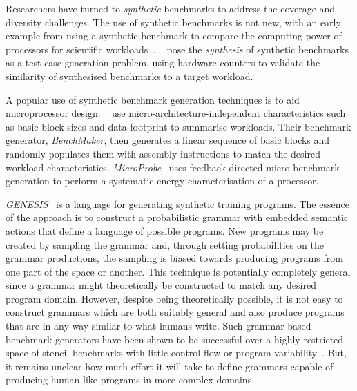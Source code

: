 Researchers have turned to \emph{synthetic} benchmarks to address the coverage and diversity challenges.
The use of synthetic benchmarks is not new, with an early example from \citeyear{Curnow1976} using a synthetic benchmark to compare the computing power of processors for scientific workloads~\cite{Curnow1976}.
\citeauthor{Bell2005}~\cite{Bell2005} pose the \emph{synthesis} of synthetic benchmarks as a test case generation problem, using hardware counters to validate the similarity of synthesised benchmarks to a target workload.

A popular use of synthetic benchmark generation techniques is to aid microprocessor design. \citeauthor{Joshi2008}~\cite{Joshi2008} use micro-architecture-independent characteristics such as basic block sizes and data footprint to summarise workloads. Their benchmark generator, \emph{BenchMaker}, then generates a linear sequence of basic blocks and randomly populates them with assembly instructions to match the desired workload characteristics.
\emph{MicroProbe}~\cite{Bertran2012} uses feedback-directed micro-benchmark generation to perform a systematic energy characterisation of a processor.

\emph{GENESIS}~\cite{Chiu2015} is a language for generating synthetic training programs. The essence of the approach is to construct a probabilistic grammar with embedded semantic actions that define a language of possible programs. New programs may be created by sampling the grammar and, through setting probabilities on the grammar productions, the sampling is biased towards producing programs from one part of the space or another. This technique is potentially completely general since a grammar might theoretically be constructed to match any desired program domain. However, despite being theoretically possible, it is not easy to construct grammars which are both suitably general and also produce programs that are in any way similar to what humans write. Such grammar-based benchmark generators have been shown to be successful over a highly restricted space of stencil benchmarks with little control flow or program variability~\cite{Garvey2015b,Falch2015,Cummins2016a}. But, it remains unclear how much effort it will take to define grammars capable of producing human-like programs in more complex domains.

